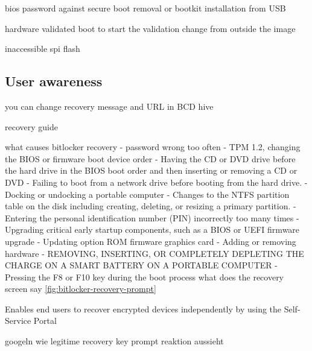 bios password against secure boot removal or bootkit installation from USB

hardware validated boot to start the validation change from outside the image

inaccessible spi flash


\subsection{User awareness}

you can change recovery message and URL in BCD hive



recovery guide

what causes bitlocker recovery
- password wrong too often
- TPM 1.2, changing the BIOS or firmware boot device order
- Having the CD or DVD drive before the hard drive in the BIOS boot order and then inserting or removing a CD or DVD
- Failing to boot from a network drive before booting from the hard drive.
- Docking or undocking a portable computer
- Changes to the NTFS partition table on the disk including creating, deleting, or resizing a primary partition.
- Entering the personal identification number (PIN) incorrectly too many times
- Upgrading critical early startup components, such as a BIOS or UEFI firmware upgrade
- Updating option ROM firmware graphics card
- Adding or removing hardware
- REMOVING, INSERTING, OR COMPLETELY DEPLETING THE CHARGE ON A SMART BATTERY ON A PORTABLE COMPUTER
- Pressing the F8 or F10 key during the boot process
what does the recovery screen say \autoref{fig:bitlocker-recovery-prompt}

Enables end users to recover encrypted devices independently by using the Self-Service Portal

googeln wie legitime recovery key prompt reaktion aussieht

